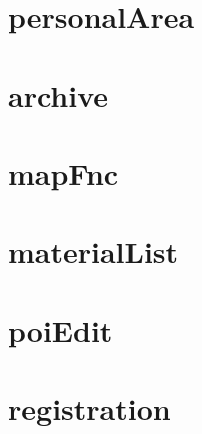 \section{personalArea}

\newpage
\section{archive}

\newpage
\section{mapFnc}

\newpage
\section{materialList}

\newpage
\section{poiEdit}

\newpage
\section{registration}
